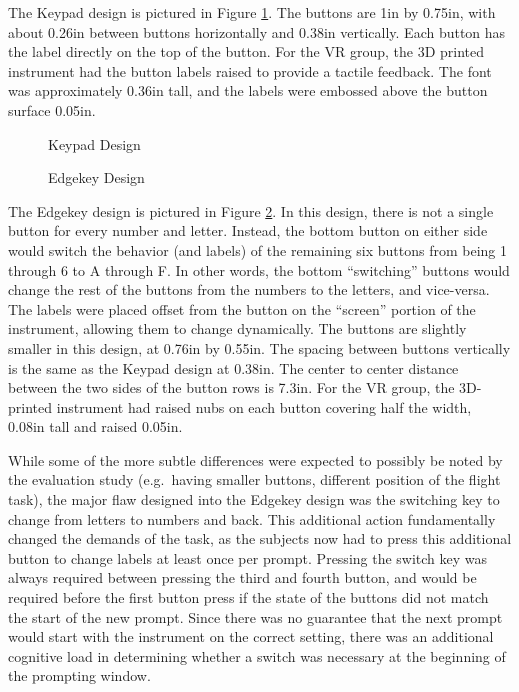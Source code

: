 The Keypad design is pictured in Figure \ref{fig:de_keypad_design}.
The buttons are 1in by 0.75in, with about 0.26in between buttons horizontally and 0.38in vertically.
Each button has the label directly on the top of the button.
For the VR group, the 3D printed instrument had the button labels raised to provide a tactile feedback.
The font was approximately 0.36in tall, and the labels were embossed above the button surface 0.05in.

\begin{figure}
    \caption{Keypad Design}
    \label{fig:de_keypad_design}
\end{figure}

\begin{figure}
    \caption{Edgekey Design}
    \label{fig:de_edgekey_design}
\end{figure}

The Edgekey design is pictured in Figure \ref{fig:de_edgekey_design}.
In this design, there is not a single button for every number and letter.
Instead, the bottom button on either side would switch the behavior (and labels) of the remaining six buttons from being 1 through 6 to A through F.
In other words, the bottom ``switching'' buttons would change the rest of the buttons from the numbers to the letters, and vice-versa.
The labels were placed offset from the button on the ``screen'' portion of the instrument, allowing them to change dynamically.
The buttons are slightly smaller in this design, at 0.76in by 0.55in.
The spacing between buttons vertically is the same as the Keypad design at 0.38in.
The center to center distance between the two sides of the button rows is 7.3in.
For the VR group, the 3D-printed instrument had raised nubs on each button covering half the width, 0.08in tall and raised 0.05in.

While some of the more subtle differences were expected to possibly be noted by the evaluation study (e.g.\ having smaller buttons, different position of the flight task), the major flaw designed into the Edgekey design was the switching key to change from letters to numbers and back.
This additional action fundamentally changed the demands of the task, as the subjects now had to press this additional button to change labels at least once per prompt.
Pressing the switch key was always required between pressing the third and fourth button, and would be required before the first button press if the state of the buttons did not match the start of the new prompt.
Since there was no guarantee that the next prompt would start with the instrument on the correct setting, there was an additional cognitive load in determining whether a switch was necessary at the beginning of the prompting window.



